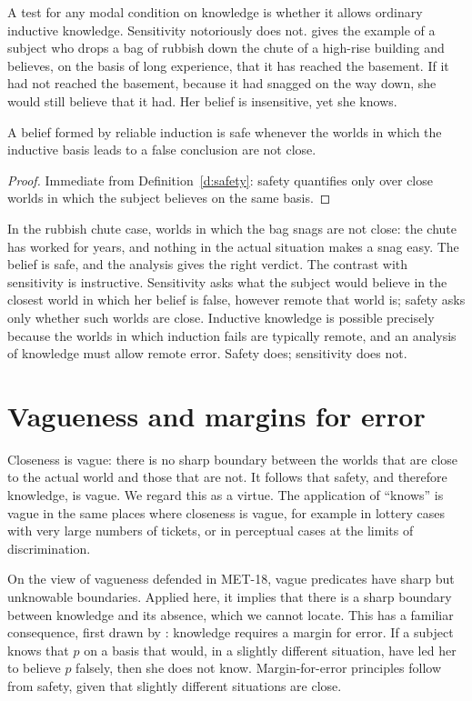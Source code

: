 \documentclass{situationist-preprint}
\begin{document}
A test for any modal condition on knowledge is whether it allows ordinary inductive knowledge. Sensitivity notoriously does not. \citet{Sosa1999} gives the example of a subject who drops a bag of rubbish down the chute of a high-rise building and believes, on the basis of long experience, that it has reached the basement. If it had not reached the basement, because it had snagged on the way down, she would still believe that it had. Her belief is insensitive, yet she knows.

\begin{proposition}\label{p:induction}
A belief formed by reliable induction is safe whenever the worlds in which the inductive basis leads to a false conclusion are not close.
\end{proposition}

\begin{proof}
Immediate from Definition~\ref{d:safety}: safety quantifies only over close worlds in which the subject believes on the same basis.
\end{proof}

In the rubbish chute case, worlds in which the bag snags are not close: the chute has worked for years, and nothing in the actual situation makes a snag easy. The belief is safe, and the analysis gives the right verdict. The contrast with sensitivity is instructive. Sensitivity asks what the subject would believe in the closest world in which her belief is false, however remote that world is; safety asks only whether such worlds are close. Inductive knowledge is possible precisely because the worlds in which induction fails are typically remote, and an analysis of knowledge must allow remote error. Safety does; sensitivity does not.

\section{Vagueness and margins for error}

Closeness is vague: there is no sharp boundary between the worlds that are close to the actual world and those that are not. It follows that safety, and therefore knowledge, is vague. We regard this as a virtue. The application of \enquote{knows} is vague in the same places where closeness is vague, for example in lottery cases with very large numbers of tickets, or in perceptual cases at the limits of discrimination.

On the view of vagueness defended in MET-18, vague predicates have sharp but unknowable boundaries. Applied here, it implies that there is a sharp boundary between knowledge and its absence, which we cannot locate. This has a familiar consequence, first drawn by \citet{Williamson2000}: knowledge requires a margin for error. If a subject knows that $p$ on a basis that would, in a slightly different situation, have led her to believe $p$ falsely, then she does not know. Margin-for-error principles follow from safety, given that slightly different situations are close.
\end{document}
